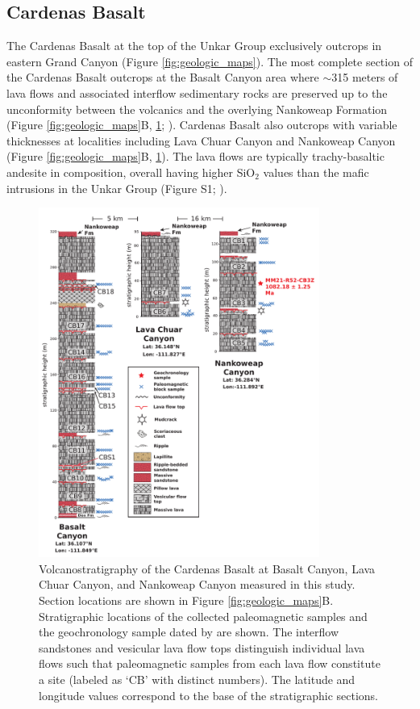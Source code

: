 \subsection*{Cardenas Basalt}

The Cardenas Basalt at the top of the Unkar Group exclusively outcrops in eastern Grand Canyon (Figure \ref{fig:geologic_maps}). The most complete section of the Cardenas Basalt outcrops at the Basalt Canyon area where $\sim$315 meters of lava flows and associated interflow sedimentary rocks are preserved up to the unconformity between the volcanics and the overlying Nankoweap Formation (Figure \ref{fig:geologic_maps}B, \ref{fig:cardenas_strat}; \cite{Lucchitta1983a, Hendricks1989a}). Cardenas Basalt also outcrops with variable thicknesses at localities including Lava Chuar Canyon and Nankoweap Canyon (Figure \ref{fig:geologic_maps}B, \ref{fig:cardenas_strat}). The lava flows are typically trachy-basaltic andesite in composition, overall having higher SiO$_2$ values than the mafic intrusions in the Unkar Group (Figure S1; \cite{Hendricks1989a, Larson1994a}).

\begin{figure}[h!]
\centering
\includegraphics[width=0.82\textwidth]{figure/Zhang2024b/Cardenas_strat_uniform_scale.pdf}
\caption{Volcanostratigraphy of the Cardenas Basalt at Basalt Canyon, Lava Chuar Canyon, and Nankoweap Canyon measured in this study. Section locations are shown in Figure \ref{fig:geologic_maps}B. Stratigraphic locations of the collected paleomagnetic samples and the geochronology sample dated by \cite{Mohr2024a} are shown. The interflow sandstones and vesicular lava flow tops distinguish individual lava flows such that paleomagnetic samples from each lava flow constitute a site (labeled as `CB' with distinct numbers). The latitude and longitude values correspond to the base of the stratigraphic sections.}
\label{fig:cardenas_strat}
\end{figure}


